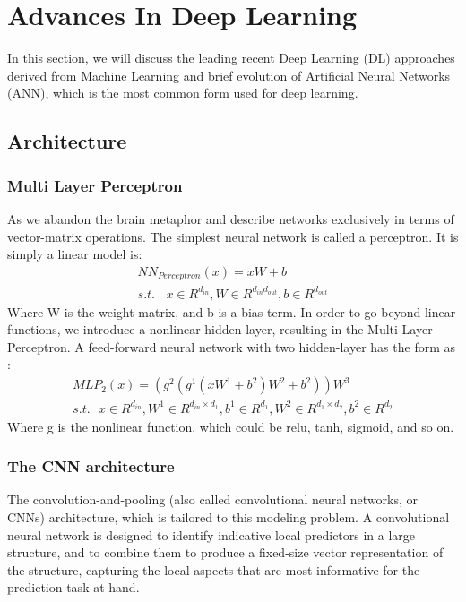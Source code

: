 \documentclass{article}
\begin{document}
\section{Advances In Deep Learning}
\label{sec:Advances In Deep Learning}
In this section, we will discuss the leading recent Deep Learning (DL) approaches derived from Machine Learning and brief evolution of Artificial Neural Networks (ANN), which is the most common form used for deep learning.

\subsection{Architecture}
\subsubsection{Multi Layer Perceptron}
As we abandon the brain metaphor and describe networks exclusively in terms of vector-matrix operations. The simplest neural network is called a perceptron. It is simply a linear model is:
\begin{align}
	NN_{Perceptron}(x)=xW + b \\  s.t. \ \ \ \ x \in R^{d_{in}},W \in R^{d_{in}d_{out}},b \in R^{d_{out}}
\end{align}
Where W is the weight matrix, and b is a bias term. In order to go beyond linear functions, we introduce a nonlinear hidden layer, resulting in the Multi Layer Perceptron. A feed-forward neural network with two hidden-layer has the form as :
\begin{align}
	MLP_2(x)=(g^2(g^1(xW^1+b^2)W^2+b^2))W^3\\s.t. \ \ \ x \in R^{d_{in}},W^1 \in R^{d_{in} \times d_{1}},b^1 \in R^{d_1},W^2 \in R^{d_{1} \times d_{2}},b^2 \in R^{d_{2}}
\end{align}
Where g is the nonlinear function, which could be relu, tanh, sigmoid, and so on.
\subsubsection{The CNN architecture}
The convolution-and-pooling (also called convolutional neural networks, or CNNs) architecture, which is tailored to this modeling problem. A convolutional neural network is designed to identify indicative local predictors in a large structure, and to combine them to produce a fixed-size vector representation of the structure, capturing the local aspects that are most informative for the prediction task at hand.
\end{document}
